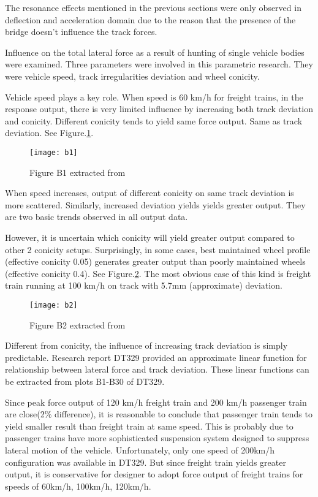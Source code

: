 The resonance effects mentioned in the previous sections were only observed in deflection and acceleration domain due to the reason that the presence of the bridge doesn't influence the track forces. 


Influence on the total lateral force as a result of hunting of single vehicle bodies were examined. Three parameters were involved in this parametric research. They were vehicle speed, track irregularities deviation and wheel conicity.

Vehicle speed plays a key role. When speed is 60 km/h for freight trains, in the response output, there is very limited influence by increasing both track deviation and conicity. Different conicity tends to yield same force output. Same as track deviation. See Figure.\ref{fig:b1}.

\begin{figure}[h!]
    \centering
    \texttt{[image: b1]}
    \caption{Figure B1 extracted from \citet{d181dt329}}
    \label{fig:b1}
\end{figure}


When speed increases, output of different conicity on same track deviation is more scattered. Similarly, increased deviation yields yields greater output. They are two basic trends observed in all output data.

However, it is uncertain which conicity will yield greater output compared to other 2 conicity setups. Surprisingly, in some cases, best maintained wheel profile (effective conicity 0.05) generates greater output than poorly maintained wheels (effective conicity 0.4). See Figure.\ref{fig:b2}. The most obvious case of this kind is freight train running at 100 km/h on track with 5.7mm (approximate) deviation.

\begin{figure}[h!]
    \centering
    \texttt{[image: b2]}
    \caption{Figure B2 extracted from \citet{d181dt329}}
    \label{fig:b2}
\end{figure}

Different from conicity, the influence of increasing track deviation is simply predictable. Research report DT329 provided an approximate linear function for relationship between lateral force and track deviation. These linear functions can be extracted from plots B1-B30 of DT329.

Since peak force output of 120 km/h freight train and 200 km/h passenger train are close(2\% difference), it is reasonable to conclude that passenger train tends to yield smaller result than freight train at same speed. This is probably due to passenger trains have more sophisticated suspension system designed to suppress lateral motion of the vehicle. Unfortunately, only one speed of 200km/h configuration was available in DT329. But since freight train yields greater output, it is conservative for designer to adopt force output of freight trains for speeds of 60km/h, 100km/h, 120km/h.

